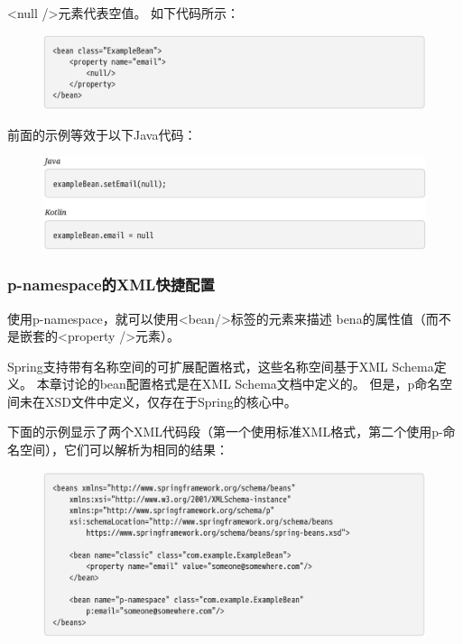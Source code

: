 <null />元素代表空值。 如下代码所示：

\begin{figure}[ht]
    \centering
    \includegraphics[width=1\linewidth]{./Figure/IMG_code_48.png}
\end{figure}


前面的示例等效于以下Java代码：

\begin{figure}[ht]
    \centering
    \includegraphics[width=1\linewidth]{./Figure/IMG_code_49.png}
\end{figure}

\subsubsection{p-namespace的XML快捷配置}
使用p-namespace，就可以使用<bean/>标签的元素来描述
bena的属性值（而不是嵌套的<property />元素）。

Spring支持带有名称空间的可扩展配置格式，这些名称空间基于XML Schema定义。 本章讨论的bean配置格式是在XML Schema文档中定义的。 但是，p命名空间未在XSD文件中定义，仅存在于Spring的核心中。

\newpage
下面的示例显示了两个XML代码段（第一个使用标准XML格式，第二个使用p-命名空间），它们可以解析为相同的结果：

\begin{figure}[ht]
    \centering
    \includegraphics[width=1\linewidth]{./Figure/IMG_code_50.png}
\end{figure}

